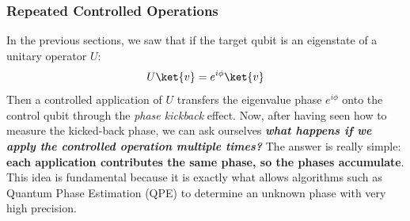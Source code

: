 \subsubsection{Repeated Controlled Operations}\label{ex:repeated-controlled-operations}

In the previous sections, we saw that if the target qubit is an eigenstate of a unitary operator $U$:
\begin{equation*}
    U \ket{v} = e^{i \phi} \ket{v}
\end{equation*}
Then a controlled application of $U$ transfers the eigenvalue phase $e^{i \phi}$ onto the control qubit through the \emph{phase kickback} effect. Now, after having seen how to measure the kicked-back phase, we can ask ourselves \emph{\textbf{what happens if we apply the controlled operation multiple times?}} The answer is really simple: \textbf{each application contributes the same phase, so the phases accumulate}. This idea is fundamental because it is exactly what allows algorithms such as Quantum Phase Estimation (QPE) to determine an unknown phase with very high precision.

